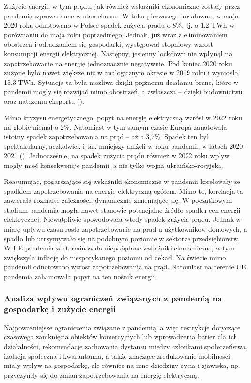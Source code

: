 \documentclass[polish, twoside, 12pt, a4paper]{article}
\theoremstyle{definition}
\theoremstyle{plain}
\theoremstyle{remark}
\begin{document}
Zużycie energii, w tym prądu, jak również wskaźniki ekonomiczne zostały przez pandemię wprowadzone w stan chaosu. W toku pierwszego lockdownu, w maju 2020 roku odnotowano w Polsce spadek zużycia prądu o 8\%, tj. o 1,2 TWh w porównaniu do maja roku poprzedniego. Jednak, już wraz z eliminowaniem obostrzeń i odradzaniem się gospodarki, występował stopniowy wzrost konsumpcji energii elektrycznej. Następny, jesienny lockdown nie wpłynął na zapotrzebowanie na energię jednoznacznie negatywnie. Pod koniec 2020 roku zużycie było nawet większe niż w analogicznym okresie w 2019 roku i wyniosło 15,3 TWh. Sytuacja ta była możliwa dzięki prężnemu działaniu branż, które w pandemii mogły się rozwijać mimo obostrzeń, a zwłaszcza – dzięki budownictwu oraz natężeniu eksportu (\cite{tygodnikprzeglad2021}). 

Mimo kryzysu energetycznego, popyt na energię elektryczną wzrósł w 2022 roku na globie niemal o 2\%. Natomiast w tym samym czasie Europa zanotowała istotny spadek zapotrzebowania na prąd – aż o 3,7\%. Spadek ten był spektakularny, aczkolwiek i tak mniejszy aniżeli w roku pandemii, w latach 2020-2021 (\cite{maciuch2023}). Jednocześnie, na spadek zużycia prądu również w 2022 roku wpływ mogły mieć konsekwencje pandemii, a nie tylko wojna ukraińsko-rosyjska. 

Reasumując, pogarszające się wskaźniki ekonomiczne w pandemii korelowały ze spadkiem zapotrzebowania na energię elektryczną ogółem. Mimo to, korelacja ta zawierała rozmaite zależności, dynamicznie zmieniające się. W początkowym stadium pandemia mogła nawet stanowić potencjalne źródło spadku cen energii elektrycznej. Niewątpliwie spowodowała wtedy spadek zużycia prądu. Jednak w miarę upływu czasu rosło zapotrzebowanie na prąd u użytkowników domowych, a spadło lub utrzymywało się na podobnym poziomie w sektorze przedsiębiorstw. W UE pandemia zdeterminowała niepożądane wskaźniki ekonomiczne, w tym zwiększyła inflację do niespotykanego poziomu od dekad. Na świecie mimo pandemii odnotowano wzrost zapotrzebowania na prąd. Natomiast na terenie UE pandemia zahamowała popyt na ten nośnik energii.


\subsubsection{Analiza wpływu ograniczeń związanych z pandemią na gospodarkę i zużycie energii}

Najpoważniejsze ograniczenia związane z pandemią, a więc restrykcje dotyczące czasowego zamknięcia obiektów komercyjnych lub wprowadzenia barier dla ich działalności, rekomendacje zachowania dystansu między członkami społeczeństwa, izolacja społeczna i kwarantanna, a także znaczące zredukowanie mobilności miały wpływ na gospodarkę, ale również na inne dziedziny życia i zjawiska, np. przyczyniły się do zmian zapotrzebowania na energię elektryczną.
\end{document}
